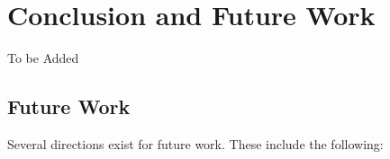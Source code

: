 \documentclass[12pt,english]{report}
\begin{document}
\chapter{Conclusion and Future Work}\label{chap:conclusion}

To be Added

\section{Future Work}

Several directions exist for future work. These include the following:

\newpage
{}



\end{document}
